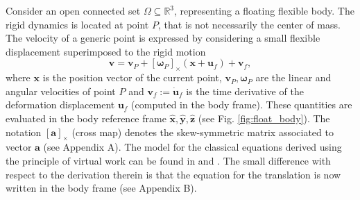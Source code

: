 \documentclass{svjour3}                     %
\newcommand{\crmat}[1]{\ensuremath{[#1]_{\times}}}
\begin{document}
Consider an open connected set $\Omega \subseteq \mathbb{R}^3$, representing a floating flexible body.  The rigid dynamics is located at point $P$, that is not necessarily the center of mass. The velocity of a generic point is expressed by considering a small flexible displacement superimposed to the rigid motion
\[
\bm{v} = \bm{v}_P + \crmat{\bm{\omega}_P} (\bm{x}+\bm{u}_f) + \bm{v}_f,
\]
where $\bm{x}$ is the position vector of the current point, $\bm{v}_P, \bm{\omega}_P$ are the linear and angular velocities of point $P$  and $\bm{v}_f := \dot{\bm{u}}_f$ is the time derivative of the deformation displacement $\bm{u}_f$ (computed in the body frame). These quantities are evaluated in the body reference frame $\widehat{\bm{x}}, \widehat{\bm{y}}, \widehat{\bm{z}}$ (see Fig. \ref{fig:float_body}). The notation $\crmat{\bm{a}}$ (cross map) denotes the skew-symmetric matrix associated to vector $\bm{a}$ (see Appendix A). The model for the classical equations derived using the principle of virtual work can be found in \cite{MB_Daepde} and \cite[Chapter 4]{simeon2013computational}. The small difference with respect to the derivation therein is that the equation for the translation is now written in the body frame (see Appendix B). 
\end{document}
